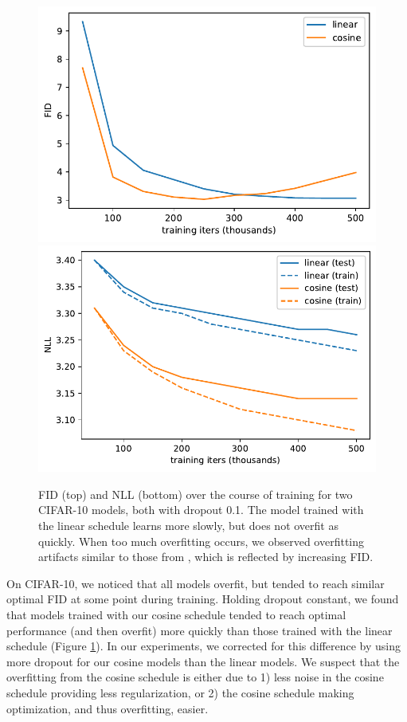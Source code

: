 \documentclass{article}
\begin{document}
\begin{figure}[ht]
    \centering
    \includegraphics[width=\columnwidth]{overfitting_fid_vs_steps-eps.pdf}
    \includegraphics[width=\columnwidth]{overfitting_nll_vs_steps-eps.pdf}
    \caption{\label{fig:overfitting} FID (top) and NLL (bottom) over the course of training for two CIFAR-10 models, both with dropout 0.1. The model trained with the linear schedule learns more slowly, but does not overfit as quickly. When too much overfitting occurs, we observed overfitting artifacts similar to those from \citet{pixelcnn++}, which is reflected by increasing FID.}
\end{figure}

On CIFAR-10, we noticed that all models overfit, but tended to reach similar optimal FID at some point during training. Holding dropout constant, we found that models trained with our cosine schedule tended to reach optimal performance (and then overfit) more quickly than those trained with the linear schedule (Figure \ref{fig:overfitting}). In our experiments, we corrected for this difference by using more dropout for our cosine models than the linear models. We suspect that the overfitting from the cosine schedule is either due to 1) less noise in the cosine schedule providing less regularization, or 2) the cosine schedule making optimization, and thus overfitting, easier.
\end{document}
